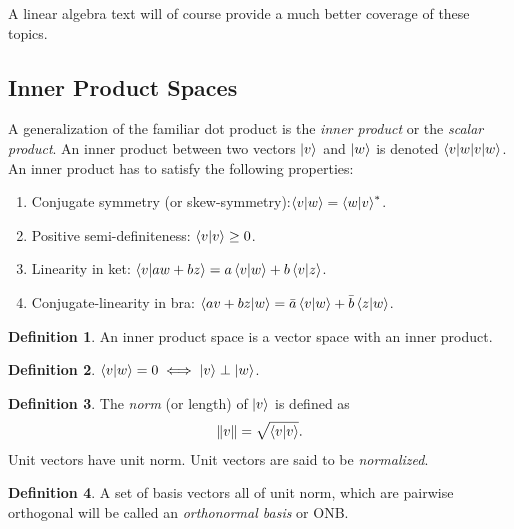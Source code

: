\documentclass{book}
\theoremstyle{definition}
\newtheorem{defn}{Definition}[section]
\begin{document}
A linear algebra text will of course provide a much better coverage of these topics. 















\subsection{Inner Product Spaces}


A generalization of the familiar dot product is the \textit{inner product} or the \textit{scalar product}. An inner product between two vectors $\ket{v}$ and $\ket{w}$ is denoted $\braket{v|w}$. An inner product has to satisfy the following properties:

\begin{enumerate}
	\item Conjugate symmetry (or skew-symmetry):$\braket{v}{w} = \braket{w}{v}^*$.
	\item Positive semi-definiteness: $\braket{v}{v} \geq 0$.
	\item Linearity in ket: $\braket{v}{aw + bz} = a\braket{v}{w} + b\braket{v}{z}$.
	\item Conjugate-linearity in bra: $\braket{av + bz}{w} = \bar{a}\braket{v}{w} + \bar{b}\braket{z}{w}$.
\end{enumerate}




\begin{defn}
	An inner product space is a vector space with an inner product. 
\end{defn}


\begin{defn}
	$\innerproduct{v}{w} = 0 \iff \ket{v} \perp \ket{w}$. 
\end{defn}


\begin{defn}
	The \textit{norm} (or length) of $\ket{v}$ is defined as 
	\begin{align}
	\norm{v} = \sqrt{\braket{v}}.
	\end{align}
	Unit vectors have unit norm. Unit vectors are said to be \textit{normalized}.  
\end{defn}




\begin{defn}
	A set of basis vectors all of unit norm, which are pairwise orthogonal will be called an \textit{orthonormal basis} or ONB. 
\end{defn}
\end{document}
